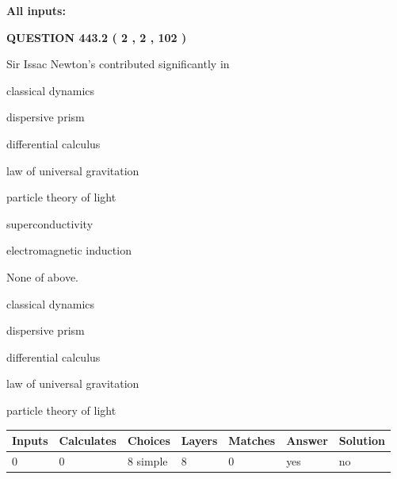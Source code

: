 \documentclass[12pt]{article}
\begin{document}
   
   
   
\noindent{}
   
   
   
   
\noindent\vspace{0.1in}\hspace{-0.08in} {\textbf{\Large{All inputs: }}}
   
   
  
\vspace{0.2in}
  
{\textbf{\Large{QUESTION
443.2 
 ( 2 , 2 , 102 )
}}}
  
  
Sir Issac Newton's contributed significantly in
 
 
classical dynamics
 
 
dispersive prism
 
 
differential calculus
 
 
law of universal gravitation
 
 
particle theory of light
 
 
superconductivity
 
 
electromagnetic induction
 
 
 None of above.
 
 
\noindent{}
 
 
classical dynamics
 
 
dispersive prism
 
 
differential calculus
 
 
law of universal gravitation
 
 
particle theory of light
 
 
\noindent{}
 
 
   
   
   
   
\noindent\begin{tabular}{|l|l|l|l|l|l|l|}
 \hline
Inputs & Calculates & Choices & Layers & Matches & Answer & Solution \\ \hline
 0  & 
 0  & 
 8
  simple  
  & 
 8  & 
 0  & 
  yes & 
  no 
  \\ \hline
 \end{tabular}
   
\end{document}
